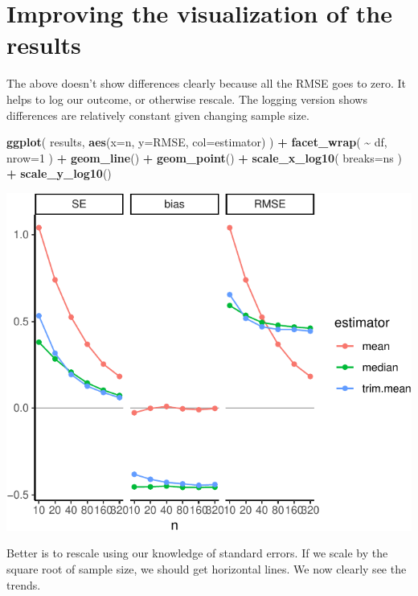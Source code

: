 \documentclass[
]{book}
\newenvironment{Shaded}{\begin{snugshade}}{\end{snugshade}}
\newcommand{\AttributeTok}[1]{\textcolor[rgb]{0.13,0.29,0.53}{#1}}
\newcommand{\DecValTok}[1]{\textcolor[rgb]{0.00,0.00,0.81}{#1}}
\newcommand{\FunctionTok}[1]{\textcolor[rgb]{0.13,0.29,0.53}{\textbf{#1}}}
\newcommand{\NormalTok}[1]{#1}
\newcommand{\SpecialCharTok}[1]{\textcolor[rgb]{0.81,0.36,0.00}{\textbf{#1}}}
\begin{document}
\section{Improving the visualization of the results}\label{improving-the-visualization-of-the-results}

The above doesn't show differences clearly because all the RMSE goes to zero.
It helps to log our outcome, or otherwise rescale. The logging version shows
differences are relatively constant given changing sample size.

\begin{Shaded}
\begin{Highlighting}[]
\FunctionTok{ggplot}\NormalTok{( results, }\FunctionTok{aes}\NormalTok{(}\AttributeTok{x=}\NormalTok{n, }\AttributeTok{y=}\NormalTok{RMSE, }\AttributeTok{col=}\NormalTok{estimator) ) }\SpecialCharTok{+}
    \FunctionTok{facet\_wrap}\NormalTok{( }\SpecialCharTok{\textasciitilde{}}\NormalTok{ df, }\AttributeTok{nrow=}\DecValTok{1}\NormalTok{ ) }\SpecialCharTok{+}
    \FunctionTok{geom\_line}\NormalTok{() }\SpecialCharTok{+} \FunctionTok{geom\_point}\NormalTok{() }\SpecialCharTok{+}
    \FunctionTok{scale\_x\_log10}\NormalTok{( }\AttributeTok{breaks=}\NormalTok{ns ) }\SpecialCharTok{+}
    \FunctionTok{scale\_y\_log10}\NormalTok{()}
\end{Highlighting}
\end{Shaded}

\begin{center}\includegraphics[width=0.75\linewidth]{Designing-Simulations-in-R_files/figure-latex/unnamed-chunk-189-1} \end{center}

Better is to rescale using our knowledge of standard errors. If we scale by
the square root of sample size, we should get horizontal lines. We now
clearly see the trends.
\end{document}
